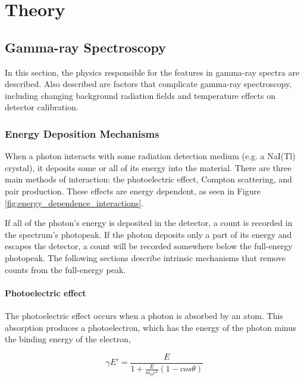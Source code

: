 \chapter{Theory}

\section{Gamma-ray Spectroscopy}

In this section, the physics responsible for the features in gamma-ray spectra are described. Also described are factors that complicate gamma-ray spectroscopy, including changing background radiation fields and temperature effects on detector calibration.


\subsection{Energy Deposition Mechanisms}

When a photon interacts with some radiation detection medium (e.g. a NaI(Tl) crystal), it deposits some or all of its energy into the material. There are three main methods of interaction: the photoelectric effect, Compton scattering, and pair production. These effects are energy dependent, as seen in Figure \ref{fig:energy_dependence_interactions}.

If all of the photon's energy is deposited in the detector, a count is recorded in the spectrum's photopeak. If the photon deposits only a part of its energy and escapes the detector, a count will be recorded somewhere below the full-energy photopeak.  The following sections describe intrinsic mechanisms that remove counts from the full-energy peak. %

\subsubsection{Photoelectric effect}

The photoelectric effect occurs when a photon is absorbed by an atom. This absorption produces a photoelectron, which has the energy of the photon minus the binding energy of the electron, 

\begin{equation} \label{eq:compton_scatter}
\gamma 

E' = \frac{E}{1 + \frac{E}{m_{0} c^2} (1-cos\theta)}
\end{equation}

